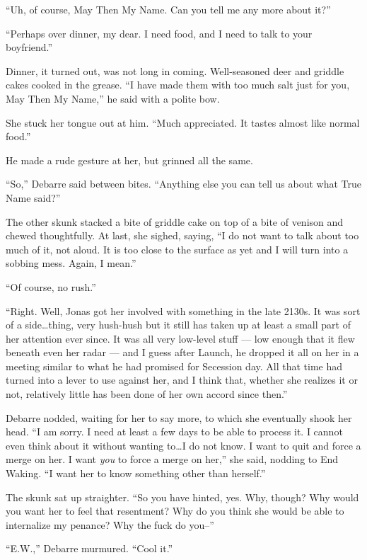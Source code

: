 ``Uh, of course, May Then My Name. Can you tell me any more about it?''

``Perhaps over dinner, my dear. I need food, and I need to talk to your boyfriend.''

Dinner, it turned out, was not long in coming. Well-seasoned deer and griddle cakes cooked in the grease. ``I have made them with too much salt just for you, May Then My Name,'' he said with a polite bow.

She stuck her tongue out at him. ``Much appreciated. It tastes almost like normal food.''

He made a rude gesture at her, but grinned all the same.

``So,'' Debarre said between bites. ``Anything else you can tell us about what True Name said?''

The other skunk stacked a bite of griddle cake on top of a bite of venison and chewed thoughtfully. At last, she sighed, saying, ``I do not want to talk about too much of it, not aloud. It is too close to the surface as yet and I will turn into a sobbing mess. Again, I mean.''

``Of course, no rush.''

``Right. Well, Jonas got her involved with something in the late 2130s. It was sort of a side\ldots thing, very hush-hush but it still has taken up at least a small part of her attention ever since. It was all very low-level stuff — low enough that it flew beneath even her radar — and I guess after Launch, he dropped it all on her in a meeting similar to what he had promised for Secession day. All that time had turned into a lever to use against her, and I think that, whether she realizes it or not, relatively little has been done of her own accord since then.''

Debarre nodded, waiting for her to say more, to which she eventually shook her head. ``I am sorry. I need at least a few days to be able to process it. I cannot even think about it without wanting to\ldots I do not know. I want to quit and force a merge on her. I want \emph{you} to force a merge on her,'' she said, nodding to End Waking. ``I want her to know something other than herself.''

The skunk sat up straighter. ``So you have hinted, yes. Why, though? Why would you want her to feel that resentment? Why do you think she would be able to internalize my penance? Why the fuck do you--''

``E.W.,'' Debarre murmured. ``Cool it.''

